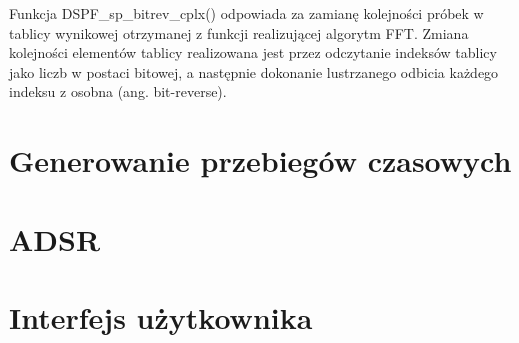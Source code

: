 Funkcja DSPF\_sp\_bitrev\_cplx() odpowiada za zamianę kolejności próbek w tablicy wynikowej otrzymanej z funkcji realizującej algorytm FFT. Zmiana kolejności elementów tablicy realizowana jest przez odczytanie indeksów tablicy jako liczb w postaci bitowej, a następnie dokonanie lustrzanego odbicia każdego indeksu z osobna (ang. bit-reverse).


\section{Generowanie przebiegów czasowych}


\section{ADSR}



\section{Interfejs użytkownika}